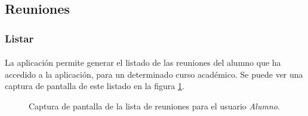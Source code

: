 \subsection{Reuniones}

  \subsubsection{Listar}

  \paragraph{}La aplicación permite generar el listado de las reuniones del
  alumno que ha accedido a la aplicación, para un determinado curso
  académico. Se puede ver una captura de pantalla de este listado en la figura
  \ref{capturaPantallaListaReuniones}.

  \begin{figure}[!ht]
    \begin{center}
      \caption{Captura de pantalla de la lista de reuniones para el usuario \textit{Alumno}.}
      \label{capturaPantallaListaReuniones}
    \end{center}
  \end{figure}
